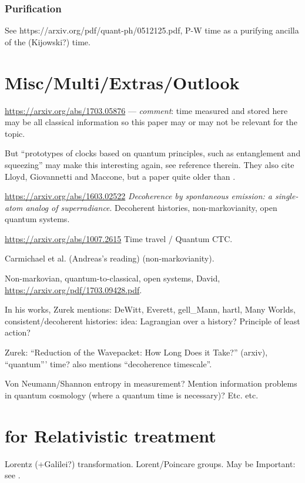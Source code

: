 \subsubsection{Purification}

See https://arxiv.org/pdf/quant-ph/0512125.pdf, P-W time as a purifying ancilla
of the (Kijowski?) time.

\section{Misc/Multi/Extras/Outlook}

\url{https://arxiv.org/abs/1703.05876}
--- \emph{comment}: time measured and stored here
may be all classical information
so this paper may or may not be relevant for the topic.

But
``prototypes of clocks based on quantum principles,
such as entanglement and squeezing''
may make this interesting again, see reference therein.
They also cite Lloyd, Giovannetti and Maccone,
but a paper quite older than \cite{Lloyd:Time}.

\url{https://arxiv.org/abs/1603.02522}
\emph{Decoherence by spontaneous emission: a single-atom analog of superradiance}.
Decoherent histories, non-markovianity, open quantum systems.

\url{https://arxiv.org/abs/1007.2615} Time travel / Quantum CTC.

Carmichael et al. \cite{CarmichaelOQS2017} (Andreas's reading)
(non-markovianity).

Non-markovian, quantum-to-classical, open systems, David,
\url{https://arxiv.org/pdf/1703.09428.pdf}.

In his works, Zurek mentions:
DeWitt, Everett, gell_Mann, hartl, Many Worlds, consistent/decoherent histories:
idea: Lagrangian over a history? Principle of least action?

Zurek: ``Reduction of the Wavepacket: How Long Does it Take?'' (arxiv),
``quantum''' time? \cite{Zurek_Einselect} also mentions
``decoherence timescale''.

Von Neumann/Shannon entropy in measurement? Mention information problems
in quantum cosmology (where a quantum time is necessary)? Etc. etc.

\section{for Relativistic treatment}

Lorentz (+Galilei?) transformation. Lorent/Poincare groups. May be Important:
see \cite{LocalizationEntanglmentRelativistic}.

